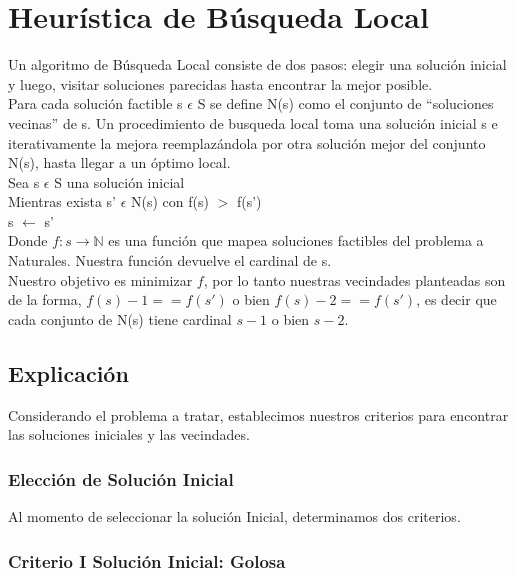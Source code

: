 \section{Heur\'istica de B\'usqueda Local} \label{ej4}
Un algoritmo de Búsqueda Local consiste de dos pasos: elegir una solución inicial y luego, visitar soluciones parecidas hasta encontrar la mejor posible.\\

Para cada solución factible s $\epsilon$ S se define N(s) como el conjunto de
``soluciones vecinas'' de s. Un procedimiento de busqueda local toma una solución inicial s e iterativamente la mejora reemplazándola por otra solución mejor del conjunto N(s), hasta llegar a un óptimo local.\\

Sea s $\epsilon$ S una solución inicial\\
 
Mientras exista s' $\epsilon$ N(s) con f(s) $>$ f(s')\\
 
s $\leftarrow$ s'\\

Donde $f: s \rightarrow \mathbb{N}$ es una funci\'on que mapea soluciones factibles del problema a Naturales. Nuestra funci\'on devuelve el cardinal de s.\\

Nuestro objetivo es minimizar $f$, por lo tanto nuestras vecindades planteadas son de la forma, $f(s) - 1 == f(s')$ o bien $f(s) - 2 == f(s')$, es decir que cada conjunto de N(s) tiene cardinal $s - 1$ o bien $s - 2$.

\subsection{Explicaci\'on}

Considerando el problema a tratar, establecimos nuestros criterios para encontrar las soluciones iniciales y las vecindades.


\subsubsection{Elección de Solución Inicial}

Al momento de seleccionar la solución Inicial, determinamos dos criterios.

\subsubsection*{Criterio I Solución Inicial: Golosa}

